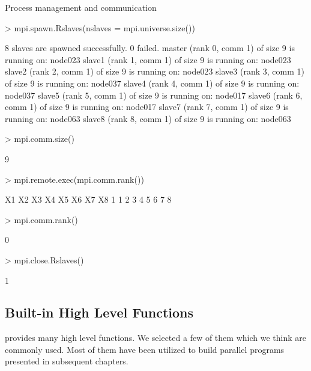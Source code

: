 \begin{Example} Process management and communication 

\begin{Schunk}
\begin{Sinput}
> mpi.spawn.Rslaves(nslaves = mpi.universe.size())
\end{Sinput}
\begin{Soutput}
	8 slaves are spawned successfully. 0 failed.
master (rank 0, comm 1) of size 9 is running on: node023 
slave1 (rank 1, comm 1) of size 9 is running on: node023 
slave2 (rank 2, comm 1) of size 9 is running on: node023 
slave3 (rank 3, comm 1) of size 9 is running on: node037 
slave4 (rank 4, comm 1) of size 9 is running on: node037 
slave5 (rank 5, comm 1) of size 9 is running on: node017 
slave6 (rank 6, comm 1) of size 9 is running on: node017 
slave7 (rank 7, comm 1) of size 9 is running on: node063 
slave8 (rank 8, comm 1) of size 9 is running on: node063 
\end{Soutput}
\begin{Sinput}
> mpi.comm.size()
\end{Sinput}
\begin{Soutput}
[1] 9
\end{Soutput}
\begin{Sinput}
> mpi.remote.exec(mpi.comm.rank())
\end{Sinput}
\begin{Soutput}
  X1 X2 X3 X4 X5 X6 X7 X8
1  1  2  3  4  5  6  7  8
\end{Soutput}
\begin{Sinput}
> mpi.comm.rank()
\end{Sinput}
\begin{Soutput}
[1] 0
\end{Soutput}
\begin{Sinput}
> mpi.close.Rslaves()
\end{Sinput}
\begin{Soutput}
[1] 1
\end{Soutput}
\end{Schunk}
\label{ex:Rmpi2}
\end{Example}
 
\subsection{Built-in High Level Functions}

 provides many high level functions. We selected a few
of them which we think are commonly used. Most of them have been
utilized to build parallel programs presented in subsequent
chapters.

